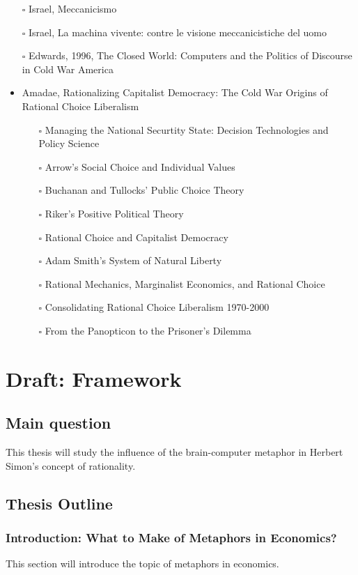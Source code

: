 \documentclass[paper=B6,portrait,twoside=true,twocolumn=false,headinclude=true,footinclude=false,fontsize=12,BCOR=10mm,DIV=calc,pagesize=auto,titlepage=firstiscover,mpinclude=false,headings=normal,headings=twolinechapter,open=right,toc=graduated,chapterprefix=false,numbers=endperiod,parskip=half+]{scrbook}
\theoremstyle{definition}
\begin{document}
\begin{itemize}
\item[{$\square$}] Israel,  Meccanicismo
\item[{$\square$}] Israel, La machina vivente: contre le visione meccanicistiche del uomo
\item[{$\square$}] Edwards, 1996, The Closed World: Computers and the Politics of Discourse in Cold War America
\item\relax [0/9] Amadae, Rationalizing Capitalist Democracy: The Cold War Origins of
Rational Choice Liberalism
\begin{itemize}
\item[{$\square$}] Managing the National Securtity State: Decision Technologies and Policy Science
\item[{$\square$}] Arrow's Social Choice and Individual Values
\item[{$\square$}] Buchanan and Tullocks' Public Choice Theory
\item[{$\square$}] Riker's Positive Political Theory
\item[{$\square$}] Rational Choice and Capitalist Democracy
\item[{$\square$}] Adam Smith's System of Natural Liberty
\item[{$\square$}] Rational Mechanics, Marginalist Economics, and Rational Choice
\item[{$\square$}] Consolidating Rational Choice Liberalism 1970-2000
\item[{$\square$}] From the Panopticon to the Prisoner's Dilemma
\end{itemize}
\end{itemize}
\chapter{Draft: Framework}
\label{sec:orgb769190}
\section{Main question}
\label{sec:org85e0780}
This thesis will study the influence of the brain-computer metaphor in
Herbert Simon's concept of rationality. 
\section{Thesis Outline}
\label{sec:org50f90cb}
\subsection{Introduction: What to Make of Metaphors in Economics?}
\label{sec:org3096982}
This section will introduce the topic of metaphors in economics. 
\end{document}
